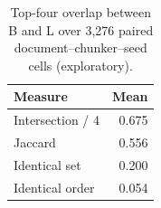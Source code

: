 \begin{table}[htbp]\centering\small
\caption{Top-four overlap between B and L over 3,276 paired document--chunker--seed cells (exploratory).}\label{tab:overlap}
\begin{tabular}{lr}\toprule
Measure & Mean\\\midrule
Intersection / 4 & 0.675\\
Jaccard & 0.556\\
Identical set & 0.200\\
Identical order & 0.054\\
\bottomrule\end{tabular}\end{table}
